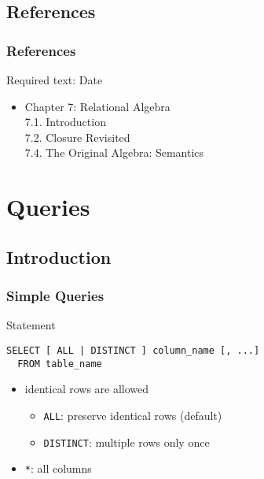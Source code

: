 \documentclass[dvipsnames]{beamer}
\theoremstyle{plain}
\begin{document}
\subsection*{References}

\begin{frame}
  \frametitle{References}

  \begin{block}{Required text: Date}
    \begin{itemize}
      \item Chapter 7: Relational Algebra\\
        7.1. \alert{Introduction}\\
        7.2. \alert{Closure Revisited}\\
        7.4. \alert{The Original Algebra: Semantics}
    \end{itemize}
  \end{block}
\end{frame}

\lstset{language=FullSQL}

\section{Queries}

\subsection{Introduction}

\begin{frame}[fragile]
  \frametitle{Simple Queries}

  \begin{block}{Statement}
    \begin{lstlisting}
SELECT [ ALL | DISTINCT ] column_name [, ...]
  FROM table_name
    \end{lstlisting}
  \end{block}

  \pause
  \begin{itemize}
    \item identical rows are allowed
    \begin{itemize}
        \item \lstinline!ALL!: preserve identical rows (default)
        \item \lstinline!DISTINCT!: multiple rows only once
    \end{itemize}

    \pause
    \item \lstinline!*!: all columns
  \end{itemize}
\end{frame}
\end{document}

